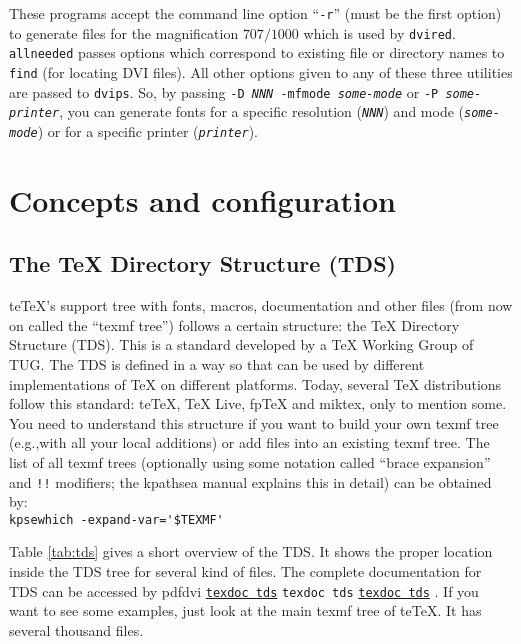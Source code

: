 \documentclass[11pt,a4paper]{article}
\newcommand{\pdfext}{pdf}
\newcommand{\dviext}{dvi}
\newcommand{\dlink}[3]{%
  \ifpdf
    \ifx\pdfext#3
      \href{#1/#2.#3}{\texttt{texdoc #2}}%
    \else
      \texttt{texdoc #2}%
    \fi
  \else
     \href{#1/#2.#3}{\mbox{\texttt{texdoc #2}}}%
  \fi}
\newcommand{\teTeX}{\textrm{te}\TeX\xspace}
\begin{document}
\begin{description}
  These programs accept the command line option ``\texttt{-r}'' (must
  be the first option) to generate files for the magnification $707 /
  1000$ which is used by \texttt{dvired}. \texttt{allneeded} passes
  options which correspond to existing file or directory names to
  \texttt{find} (for locating DVI files). All other options given to
  any of these three utilities are passed to \texttt{dvips}. So, by
  passing \texttt{-D \textit{NNN} -mfmode \textit{some-mode}} or
  \texttt{-P \textit{some-printer}}, you can generate fonts for a
  specific resolution (\texttt{\textit{NNN}}) and mode
  (\texttt{\textit{some-mode}}) or for a specific printer
  (\texttt{\textit{printer}}).
\end{description}


\section{Concepts and configuration}

\subsection{The \TeX{} Directory Structure (TDS)}
\teTeX{}'s support tree with fonts, macros, documentation and other
files (from now on called the ``texmf tree'') follows a certain
structure: the \TeX{} Directory Structure (TDS). This is a standard
developed by a \TeX{} Working Group of TUG. The TDS is defined in a
way so that can be used by different implementations of \TeX{} on
different platforms.  Today, several \TeX{} distributions follow this
standard: \teTeX, \TeX{} Live, fp\TeX{} and miktex, only to mention
some.  You need to understand this structure if you want to build your
own texmf tree (e.g.,\@ with all your local additions) or add files
into an existing texmf tree.  The list of all texmf trees (optionally
using some notation called ``brace expansion'' and \verb+!!+
modifiers; the kpathsea manual
explains this in detail) can be obtained by:\\
\null\qquad\verb+kpsewhich -expand-var='$TEXMF'+ %


\def\replaceable#1{{\rmfamily $\langle$\textit{#1}$\rangle$}}
Table
\ref{tab:tds} gives a short overview of the TDS. It shows the proper
location inside the TDS tree for several kind of files. The complete
documentation for TDS can be accessed by
\dlink{../../../texmf-dist/doc/help}{tds}{\dviext}. If you want to see some examples, just
look at the main texmf tree of \teTeX. It has several thousand
files.\bigskip
\end{document}

